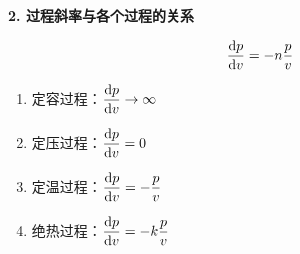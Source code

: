 \noindent \textbf{2. 过程斜率与各个过程的关系}
\begin{itemizea}
	\item \vspace*{-0.5em}
	\begin{equation}
		\frac{{\rm{d}} p}{{\rm{d}} v} = - n \frac{p}{v}
	\end{equation}
\end{itemizea}
\begin{enumerate}[(1) ]
	\item 定容过程：$\dfrac{{\rm{d}} p}{{\rm{d}} v} \to \infty $
	\item 定压过程：$\dfrac{{\rm{d}} p}{{\rm{d}} v} =0$
	\item 定温过程：$\dfrac{{\rm{d}} p}{{\rm{d}} v} = -\dfrac{p}{v}$
	\item 绝热过程：$\dfrac{{\rm{d}} p}{{\rm{d}} v} = - k \dfrac{p}{v}$
\end{enumerate}

